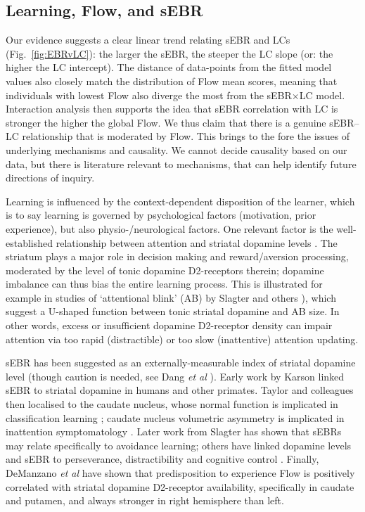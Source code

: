 \documentclass[fleqn,10pt]{wlscirep}
\begin{document}
\subsection*{Learning, Flow, and sEBR}
Our evidence suggests a clear linear trend relating sEBR and LCs (Fig.~\ref{fig:EBRvLC}): the larger the sEBR, the steeper the LC slope (or: the higher the LC intercept). The distance of data-points from the fitted model values also closely match the distribution of Flow mean scores, meaning that individuals with lowest Flow also diverge the most from the sEBR$\times$LC model. Interaction analysis then supports the idea that sEBR correlation with LC is stronger the higher the global Flow. We thus claim that there is a genuine sEBR--LC relationship that is moderated by Flow. This brings to the fore the issues of underlying mechanisms and causality. We cannot decide causality based on our data, but there is literature relevant to mechanisms, that can help identify future directions of inquiry.

Learning is influenced by the context-dependent disposition of the learner, which is to say learning is governed by psychological factors (motivation, prior experience), but also physio-/neurological factors. One relevant factor is the well-established relationship between attention and striatal dopamine levels \cite{Dreisbach2005}. The striatum plays a major role in decision making and reward/aversion processing, moderated by the level of tonic dopamine D2-receptors therein; dopamine imbalance can thus bias the entire learning process. This is illustrated for example in studies of `attentional blink' (AB) by Slagter and others \cite{Slagter2012,COLZATO2008}), which suggest a U-shaped function between tonic striatal dopamine and AB size. In other words, excess or insufficient dopamine D2-receptor density can impair attention via too rapid (distractible) or too slow (inattentive) attention updating.

sEBR has been suggested as an externally-measurable index of striatal dopamine level (though caution is needed, see Dang {\it et al} \cite{dang2017spontaneous}). Early work by Karson \cite{Karson1983} linked sEBR to striatal dopamine in humans and other primates. Taylor and colleagues \cite{Taylor1999} then localised to the caudate nucleus, whose normal function is implicated in classification learning \cite{Seger2005}; caudate nucleus volumetric asymmetry is implicated in inattention symptomatology \cite{Schrimsher2002}. Later work from Slagter \cite{Slagter2015} has shown that sEBRs may relate specifically to avoidance learning; others have linked dopamine levels and sEBR to perseverance, distractibility and cognitive control \cite{Muller2007,Dreisbach2005}. Finally, DeManzano {\it et al} \cite{DeManzano2013} have shown that  predisposition to experience Flow is positively correlated with striatal dopamine D2-receptor availability, specifically in caudate and putamen, and always stronger in right hemisphere than left.
\end{document}

